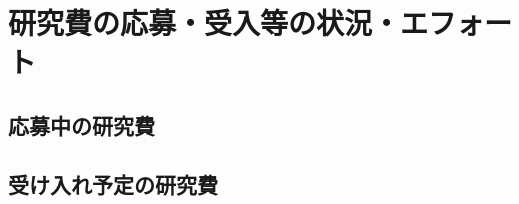 \documentclass[11pt,a4paper,twoside]{jarticle}
\newcommand{\研究種別}{A}	%
\newcommand{\研究課題名}{コ・クリエイティブなソフトウェア開発者を育成するPBL型教育}
\newcommand{\研究機関名}{産業技術大学院大学}
\newcommand{\研究代表者氏名}{中鉢　欣秀}
\newcommand{\研究代表者氏名ふりがな}{ちゅうばち　よしひで}
\newcommand{\本応募effort}{\KLEffort{18}}	%
\newcommand{\研究期間の最終元号年度}{27}	%
\begin{document}
\section{研究費の応募・受入等の状況・エフォート}
\subsection{応募中の研究費}
\newcommand{\本人の研究経費}{%
	\KLMyBudget{}{}%
}

\newcommand{\応募中の研究費}{%
		
		
}

\subsection{受け入れ予定の研究費}
\newcommand{\受け入れ予定の研究費}{%
}





\end{document}
